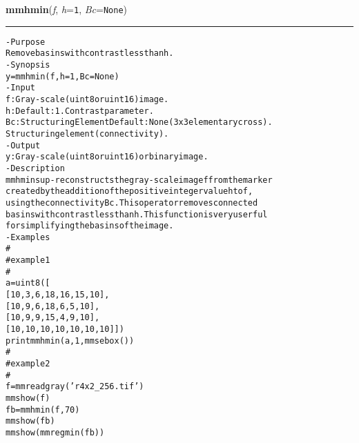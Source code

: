     \begin{boxedminipage}{\textwidth}

    \raggedright \textbf{mmhmin}(\textit{f}, \textit{h}=\texttt{1\-}, \textit{Bc}=\texttt{N\-o\-n\-e\-})

    \vspace{-1.5ex}

    \rule{\textwidth}{0.5\fboxrule}
\begin{alltt}
- Purpose
    Remove basins with contrast less than h.
- Synopsis
    y = mmhmin(f, h=1, Bc=None)
- Input
    f:  Gray-scale (uint8 or uint16) image.
    h:  Default: 1. Contrast parameter.
    Bc: Structuring Element Default: None (3x3 elementary cross).
        Structuring element (connectivity).
- Output
    y: Gray-scale (uint8 or uint16) or binary image.
- Description
    mmhmin sup-reconstructs the gray-scale image f from the marker
    created by the addition of the positive integer value h to f ,
    using the connectivity Bc . This operator removes connected
    basins with contrast less than h . This function is very userful
    for simplifying the basins of the image.
- Examples
    \#
    \#   example 1
    \#
    a = uint8([
        [10,   3,   6,  18,  16,  15,  10],
        [10,   9,   6,  18,   6,   5,  10],
        [10,   9,   9,  15,   4,   9,  10],
        [10,  10,  10,  10,  10,  10,  10]])
    print mmhmin(a,1,mmsebox())
    \#
    \#   example 2
    \#
    f = mmreadgray('r4x2\_256.tif')
    mmshow(f)
    fb = mmhmin(f,70)
    mmshow(fb)
    mmshow(mmregmin(fb))\end{alltt}

    \vspace{1ex}

    \end{boxedminipage}

    \label{multireg:num_pymorph:mmhomothick}
    \vspace{0.5ex}

